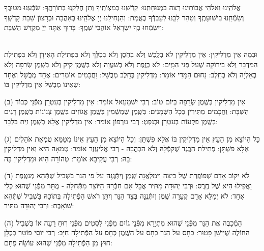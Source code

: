 \documentclass[twoside, openany, parskip=half, 11pt]{book}
\begin{document}
 אֱלֹהֵֽינוּ וֵאלֹהֵי אֲבוֹתֵֽינוּ רְצֵה בִמְנוּחָתֵֽנוּ: קַדְּֿשֵֽׁנוּ בְּמִצְוֹתֶֽיךָ וְתֵן חֶלְקֵֽנוּ בְּתוֹרָתֶֽךָ: שַׂבְּֿעֵֽנוּ מִטּוּבֶֽךָ וְשַׂמְּֿחֵֽנוּ בִּישׁוּעָתֶֽךָ וְטַהֵר לִבֵּֽנוּ לְעָבְדְּֿךָ בֶּאֱמֶת: וְהַנְחִילֵֽנוּ יְיָ אֱלֹהֵֽינוּ בְּאַהֲבָה וּבְרָצוֹן שַׁבַּת קָדְשֶֽׁךָ וְיִשְׂמְֿחוּ בְךָ יִשְׂרָאֵל אוֹהֲבֵי שְׁמֶֽךָ: בָּרוּךְ אַתָּה יְיָ מְקַדֵּשׁ הַשַּׁבָּת:

\fullkaddish




\\
 וּבַמָּה אֵין מַדְלִיקִין: אֵין מַדְלִיקִין לֹא בְלֶֽכֶשׁ וְלֹא בְחֹֽסֶן וְלֹא בְכַלָּךְ וְלֹא בִּפְתִילַת הָאִידָן וְלֹא בִּפְתִילַת הַמִּדְבָּר וְלֹא בִּירוֹקָה שֶׁעַל פְּנֵי הַמָּֽיִם: לֹא בְזֶֽפֶת וְלֹא בְשַׁעֲוָה וְלֹא בְּשֶֽׁמֶן קִיק וְלֹא בְּשֶֽׁמֶן שְׂרֵפָה וְלֹא בְאַלְיָה וְלֹא בְחֵֽלֶב: נַחוּם הַמָּדִי אוֹמֵר: מַדְלִיקִין בְּחֵֽלֶב מְבֻשָּׁל: וַחֲכָמִים אוֹמְרִים: אֶחָד מְבֻשָּׁל וְאֶחָד שֶׁאֵינוֹ מְבֻשָּׁל אֵין מַדְלִיקִין בּוֹ:
 
(ב) אֵין מַדְלִיקִין בְּשֶֽׁמֶן שְׂרֵפָה בְּיוֹם טוֹב: רְבִי יִשְׁמָעֵאל אוֹמֵר: אֵין מַדְלִיקִין בְּעִטְרָן מִפְּֿנֵי כְּבוֹד הַשַּׁבָּת: וַחֲכָמִים מַתִּירִין בְּכָל הַשְּׁמָנִים: בְּשֶֽׁמֶן שֻׁמְשְֿׁמִין בְּשֶֽׁמֶן אֱגוֹזִים בְּשֶֽׁמֶן צְנוֹנוֹת בְּשֶֽׁמֶן דָּגִים בְּשֶֽׁמֶן פַּקֻּעוֹת בְּעִטְרָן וּבְנֵפְטְ: רְבִי טַרְפוֹן אוֹמֵר: אֵין מַדְלִיקִין אֶלָּא בְּשֶֽׁמֶן זַֽיִת בִּלְבָד: 

(ג) כָּל הַיּוֹצֵא מִן הָעֵץ אֵין מַדְלִיקִין בּוֹ אֶלָּא פִשְׁתָּן: וְכָל הַיּוֹצֵא מִן הָעֵץ אֵינוֹ מִטַּמֵּא טֻמְאַת אֹהָלִים אֶלָּא פִשְׁתָּן: פְּתִילַת הַבֶּֽגֶד שֶׁקִּפְּֿלָהּ וְלֹא הִבְהֲבָהּ - רְבִי אֱלִיעֶֽזֶר אוֹמֵר: טְמֵאָה הִיא וְאֵין מַדְלִיקִין בָּהּ: רְבִי עֲקִיבָא אוֹמֵר: טְהוֹרָה הִיא וּמַדְלִיקִין בָּהּ: 

 (ד) לֹא יִקּוֹב אָדָם שְׁפוֹפֶֽרֶת שֶׁל בֵּיצָה וִימַלְּאֶֽנָּה שֶֽׁמֶן וְיִתְּֿנֶֽנָּה עַל פִּי הַנֵּר בִּשְׁבִיל שֶׁתְּֿהֵא מְנַטֶּֽפֶת וַאֲפִילוּ הִיא שֶׁל חֶֽרֶס: וּרְבִי יְהוּדָה מַתִּיר אֲבָל אִם חִבְּֿרָהּ הַיּוֹצֵר מִתְּֿחִלָּה - מֻתָּר מִפְּֿנֵי שֶׁהוּא כְּלִי אֶחָד: לֹא יְמַלֵּא אָדָם קְעָרָה שֶֽׁמֶן וְיִתְּֿנֶֽנָּה בְּצַד הַנֵּר וְיִתֵּן רֹאשׁ הַפְּֿתִילָה בְּתוֹכָהּ בִּשְׁבִיל שֶׁתְּֿהֵא שׁוֹאָֽבֶת: וּרְבִי יְהוּדָה מַתִּיר:
 
(ה) הַמְֿכַבֶּה אֶת הַנֵּר מִפְּֿנֵי שֶׁהוּא מִתְיָרֵא מִפְּֿנֵי גוֹיִם מִפְּֿנֵי לִסְטִים מִפְּֿנֵי רֽוּחַ רָעָה אוֹ בִּשְׁבִיל הַחוֹלֶה שֶׁיִּישָׁן פָּטוּר: כְּחָס עַל הַנֵּר כְּחָס עַל הַשֶּֽׁמֶן כְּחָס עַל הַפְּֿתִילָה חַיָּב: רְבִי יוֹסֵי פּוֹטֵר בְּכֻלָּן חוּץ מִן הַפְּֿתִילָה מִפְּֿנֵי שֶׁהוּא עוֹשָׂהּ פֶּחָם:
\end{document}
